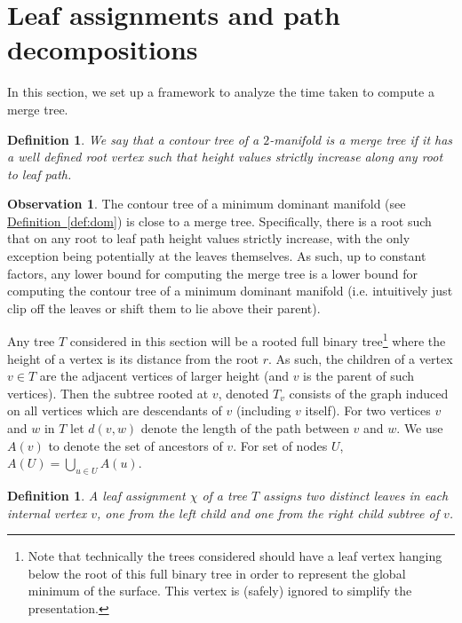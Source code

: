 \documentclass[11pt]{article}
\newtheorem{definition}[theorem]{Definition}
\theoremstyle{definition}
\newtheorem{observation}{Observation}
\newcommand{\Def}[1]{\hyperref[def:#1]{Definition~\ref*{def:#1}}} %
\begin{document}
\pagebreak
\newcommand{\pathTree}{P_{\mathcal{S}}}
\newcommand{\pathTreeA}{\mathcal{P}_{\mathcal{S}}}
\section{Leaf assignments and path decompositions}

In this section, we set up a framework to analyze the time taken to compute a merge tree.

\begin{definition}
 We say that a contour tree of a $2$-manifold is a \emph{merge tree} if it has a well defined root vertex such that height values 
 strictly increase along any root to leaf path.
\end{definition}

\begin{observation}
 The contour tree of a minimum dominant manifold (see \Def{dom}) is close to a merge tree.  Specifically, there is a root such that on any root 
 to leaf path height values strictly increase, with the only exception being potentially at the leaves themselves.  As such, up to constant 
 factors, any lower bound for computing the merge tree is a lower bound for computing the contour tree of a minimum dominant
 manifold (i.e. intuitively just clip off the leaves or shift them to lie above their parent).
\end{observation}


Any tree $T$ considered in this section will be a rooted full binary tree\footnote{Note 
that technically the trees considered should have a leaf vertex hanging below the root of this 
full binary tree in order to represent the global minimum of the surface.  This vertex is 
(safely) ignored to simplify the presentation.} where the height of a vertex is its distance 
from the root $r$.  As such, the children of a vertex $v\in T$ are the adjacent vertices of larger height
(and $v$ is the parent of such vertices).  Then the subtree rooted at $v$, denoted $T_v$ consists of the graph induced on all 
vertices which are descendants of $v$ (including $v$ itself).  For two vertices $v$ and $w$ in $T$ let $d(v,w)$ denote the 
length of the path between $v$ and $w$.
We use $A(v)$ to denote the set of ancestors of $v$.
For set of nodes $U$, $A(U) = \bigcup_{u \in U} A(u)$.


\begin{definition}
 A \emph{leaf assignment} $\chi$ of a tree $T$ assigns \emph{two} distinct leaves in each internal vertex $v$,
 one from the left child and one from the right child subtree of $v$.
\end{definition}
\end{document}

